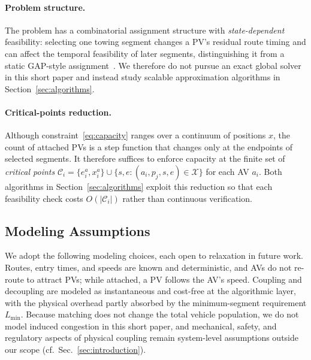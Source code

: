 \documentclass[sigconf]{acmart}
\begin{document}
\paragraph{Problem structure.} The problem has a combinatorial assignment structure with \emph{state-dependent} feasibility: selecting one towing segment changes a PV's residual route timing and can affect the temporal feasibility of later segments, distinguishing it from a static GAP-style assignment~\cite{cattrysse1992survey}. We therefore do not pursue an exact global solver in this short paper and instead study scalable approximation algorithms in Section~\ref{sec:algorithms}.

\paragraph{Critical-points reduction.} Although constraint~\eqref{eq:capacity} ranges over a continuum of positions $x$, the count of attached PVs is a step function that changes only at the endpoints of selected segments. It therefore suffices to enforce capacity at the finite set of \emph{critical points} $\mathcal{C}_i=\{e^a_i, x^a_i\}\cup\{s,e : (a_i,p_j,s,e)\in\mathcal{X}\}$ for each AV $a_i$. Both algorithms in Section~\ref{sec:algorithms} exploit this reduction so that each feasibility check costs $O(|\mathcal{C}_i|)$ rather than continuous verification.

\subsection{Modeling Assumptions}
\label{sec:assumptions}

We adopt the following modeling choices, each open to relaxation in future work. Routes, entry times, and speeds are known and deterministic, and AVs do not re-route to attract PVs; while attached, a PV follows the AV's speed. Coupling and decoupling are modeled as instantaneous and cost-free at the algorithmic layer, with the physical overhead partly absorbed by the minimum-segment requirement $L_{\min}$. Because matching does not change the total vehicle population, we do not model induced congestion in this short paper, and mechanical, safety, and regulatory aspects of physical coupling remain system-level assumptions outside our scope (cf.\ Sec.~\ref{sec:introduction}).


\end{document}
